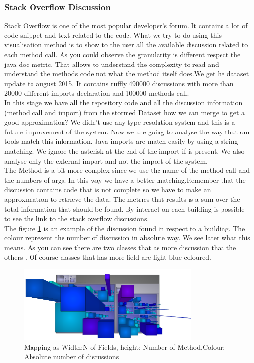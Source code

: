 \documentclass[]{usiinfbachelorproject}
\begin{document}
\subsubsection{Stack Overflow  Discussion}
Stack Overflow is one of the most popular developer's forum. It contains a lot of code snippet and text related to the code. What we try to do using this visualisation method is to show to the user all the available discussion related to each method call. As you could observe the granularity is different respect the java doc metric. That allows to understand the complexity to read and understand the methods code not what the method itself does.We get he dataset update to august  2015. It contains ruffly 490000 discussions with more than 20000 different imports declaration and 100000 methods call.\\
In this stage we have all the repository code and all the discussion information (method call and import) from the stormed Dataset how we can merge to get a good approximation? We didn't use any type resolution system and this is a future improvement of the system. Now we are going to analyse the way that our tools match this information.
Java imports are match easily by using a string matching. We ignore the asterisk at the end of the import if is present. 
We also analyse only the external import and not the import of the system.\\
The Method is a bit more complex since we use the name of the method call and the numbers of args. In this way we have a better matching.Remember that the discussion contains code that is not complete so we have to make an approximation to retrieve the data.
The metrics that results is a sum over the total information that should be found. By interact on each building is possible to see the link to the stack overflow discussions.\\
The figure \ref{fig:disc}  is an example of the discussion found in respect to a building. The colour represent the number of discussion in absolute way. We see later what this means. As you can see there are two classes that as more discussion that the others . Of course classes that has more field are light blue coloured.

\begin{figure}[H]
	\centering
	\includegraphics[width=0.8\textwidth]{images/discAbsLang}
	
	\caption[Discussion Mapping]{Mapping as Width:N of Fields, height: Number of Method,Colour: Absolute number of discussions\label{fig:disc}}

\end{figure}
\end{document}
